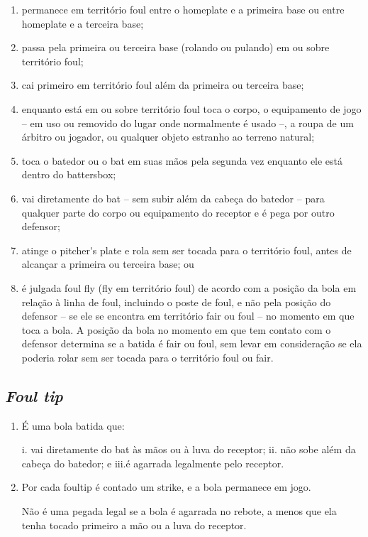 \begin{enumerate}[label=(\alph*)]
	\item   permanece em território \gls{foul} entre o \gls{homeplate} e a primeira base ou entre \gls{homeplate} e a terceira base;
	\item  passa pela primeira ou terceira base (rolando ou pulando) em ou sobre território \gls{foul};
	\item  cai primeiro em território \gls{foul} além da primeira ou terceira base;
	\item  enquanto está em ou sobre território \gls{foul} toca o corpo, o equipamento de jogo -- em uso ou removido do lugar onde normalmente é usado --, a roupa de um árbitro ou jogador, ou qualquer objeto estranho ao terreno natural;
	\item  toca o batedor ou o \gls{bat} em suas mãos pela segunda vez enquanto ele está dentro do \gls{battersbox};
	\item  vai diretamente do \gls{bat} -- sem subir além da cabeça do batedor -- para qualquer parte do corpo ou equipamento do receptor e é pega por outro defensor;
	\item   atinge o \gls{pitcher's plate} e rola sem ser tocada para o território \gls{foul}, antes de alcançar a primeira ou terceira base; ou
	\item   é julgada \gls{foul fly} (\gls{fly} em território \gls{foul}) de acordo com a posição da bola em relação à linha de \gls{foul}, incluindo o poste de \gls{foul}, e não pela posição do defensor -- se ele se encontra em território \gls{fair} ou \gls{foul} -- no momento em que toca a bola. A posição da bola no momento em que tem contato com o defensor determina se a batida é \gls{fair} ou \gls{foul}, sem levar em consideração se ela poderia rolar sem ser tocada para o território \gls{foul} ou \gls{fair}.
\end{enumerate}

\subsection{\textit{Foul tip}}
\begin{enumerate}[label=(\alph*)]
	\item   É uma bola batida que:

	 i. vai diretamente do \gls{bat} às mãos ou à luva do receptor;
	 ii. não sobe além da cabeça do batedor; e
	 iii.é agarrada legalmente pelo receptor.

	\item  Por cada \gls{foultip} é contado um \gls{strike}, e a bola permanece em jogo.

	 Não é uma pegada legal se a bola é agarrada no rebote, a menos que ela tenha tocado primeiro a mão ou a luva do receptor.
\end{enumerate}

